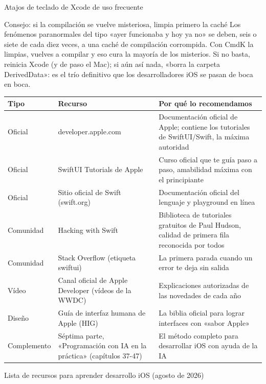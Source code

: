 \begin{center}\small\color{gray}Atajos de teclado de Xcode de uso frecuente\end{center}

\begin{tcbinfo}{Consejo: si la compilación se vuelve misteriosa, limpia primero la caché}
Los fenómenos paranormales del tipo «ayer funcionaba y hoy ya no» se deben, seis o siete de cada diez veces, a una caché de compilación corrompida. Con CmdK la limpias, vuelves a compilar y eso cura la mayoría de los misterios. Si no basta, reinicia Xcode (y de paso el Mac); si aún así nada, «borra la carpeta DerivedData»: es el trío definitivo que los desarrolladores iOS se pasan de boca en boca.

\end{tcbinfo}



\begin{center}
\begin{tabularx}{\linewidth}{|X|X|X|}
\hline
\textbf{Tipo} & \textbf{Recurso} & \textbf{Por qué lo recomendamos} \tabularnewline
\hline
Oficial & developer.apple.com & Documentación oficial de Apple; contiene los tutoriales de SwiftUI/Swift, la máxima autoridad \tabularnewline
Oficial & SwiftUI Tutorials de Apple & Curso oficial que te guía paso a paso, amabilidad máxima con el principiante \tabularnewline
Oficial & Sitio oficial de Swift (swift.org) & Documentación oficial del lenguaje y playground en línea \tabularnewline
Comunidad & Hacking with Swift & Biblioteca de tutoriales gratuitos de Paul Hudson, calidad de primera fila reconocida por todos \tabularnewline
Comunidad & Stack Overflow (etiqueta swiftui) & La primera parada cuando un error te deja sin salida \tabularnewline
Vídeo & Canal oficial de Apple Developer (vídeos de la WWDC) & Explicaciones autorizadas de las novedades de cada año \tabularnewline
Diseño & Guía de interfaz humana de Apple (HIG) & La biblia oficial para lograr interfaces con «sabor Apple» \tabularnewline
Complemento & Séptima parte, «Programación con IA en la práctica» (capítulos 37-47) & El método completo para desarrollar iOS con ayuda de la IA \tabularnewline
\hline
\end{tabularx}
\end{center}

\begin{center}\small\color{gray}Lista de recursos para aprender desarrollo iOS (agosto de 2026)\end{center}


